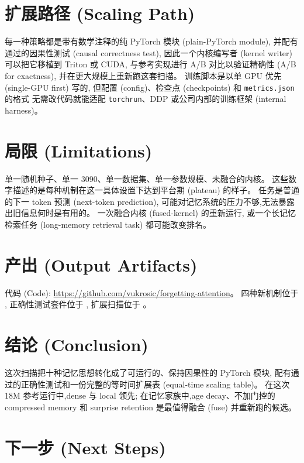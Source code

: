 \documentclass[10pt,UTF8]{ctexart}
\begin{document}
\section{扩展路径 (Scaling Path)}

每一种策略都是带有数学注释的纯 PyTorch 模块 (plain-PyTorch module),
并配有通过的因果性测试 (causal correctness test),
因此一个内核编写者 (kernel writer) 可以把它移植到 Triton 或 CUDA,
与参考实现进行 A/B 对比以验证精确性 (A/B for exactness),
并在更大规模上重新跑这套扫描。
训练脚本是以单 GPU 优先 (single-GPU first) 写的,
但配置 (config)、检查点 (checkpoints) 和 \texttt{metrics.json} 的格式
无需改代码就能适配 \texttt{torchrun}、DDP 或公司内部的训练框架 (internal harness)。

\section{局限 (Limitations)}

单一随机种子、单一 3090、单一数据集、单一参数规模、未融合的内核。
这些数字描述的是每种机制在这一具体设置下达到平台期 (plateau) 的样子。
任务是普通的下一 token 预测 (next-token prediction),
可能对记忆系统的压力不够,无法暴露出旧信息何时是有用的。
一次融合内核 (fused-kernel) 的重新运行,
或一个长记忆检索任务 (long-memory retrieval task) 都可能改变排名。

\section{产出 (Output Artifacts)}

代码 (Code): \url{https://github.com/vukrosic/forgetting-attention}。
四种新机制位于 ,
正确性测试套件位于 ,
扩展扫描位于 。

\section{结论 (Conclusion)}

这次扫描把十种记忆思想转化成了可运行的、保持因果性的 PyTorch 模块,
配有通过的正确性测试和一份完整的等时间扩展表 (equal-time scaling table)。
在这次 18M 参考运行中,dense 与 local 领先;
在记忆家族中,age decay、不加门控的 compressed memory 和 surprise retention
是最值得融合 (fuse) 并重新跑的候选。

\section{下一步 (Next Steps)}
\end{document}
